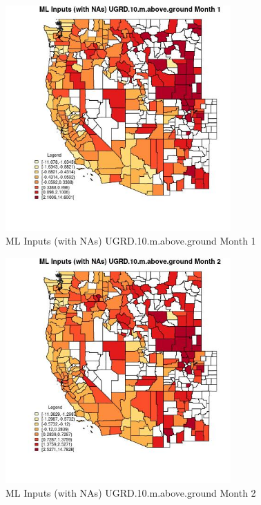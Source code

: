 \clearpage 

\begin{figure} 
\centering  
\includegraphics[width=0.77\textwidth]{Code_Outputs/Report_ML_input_PM25_Step4_part_e_de_duplicated_aves_compiled_2019-05-21wNAs_CountyUGRD10mabovegroundmedianMonth1.jpg} 
\caption{\label{fig:Report_ML_input_PM25_Step4_part_e_de_duplicated_aves_compiled_2019-05-21wNAsCountyUGRD10mabovegroundmedianMonth1}ML Inputs (with NAs) UGRD.10.m.above.ground Month 1} 
\end{figure} 
 

\begin{figure} 
\centering  
\includegraphics[width=0.77\textwidth]{Code_Outputs/Report_ML_input_PM25_Step4_part_e_de_duplicated_aves_compiled_2019-05-21wNAs_CountyUGRD10mabovegroundmedianMonth2.jpg} 
\caption{\label{fig:Report_ML_input_PM25_Step4_part_e_de_duplicated_aves_compiled_2019-05-21wNAsCountyUGRD10mabovegroundmedianMonth2}ML Inputs (with NAs) UGRD.10.m.above.ground Month 2} 
\end{figure} 
 


